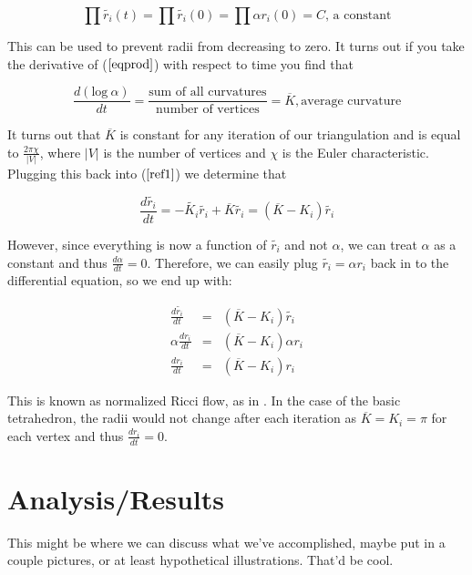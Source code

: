 \documentclass[12pt]{article}
\begin{document}
\begin{equation}
\label{eqprod}
\prod{\tilde{r_i}(t)} = \prod{\tilde{r_i}(0)} = \prod{\alpha r_i(0)} = C\mbox{, a constant}
\end{equation}

\noindent This can be used to prevent radii from decreasing to zero. It turns out if you take the derivative of ($\ref{eqprod}$) with respect to time you find that 
 
\begin{equation}
\frac{d(\mbox{log}~\alpha)}{dt} = \frac{\mbox{sum of all curvatures}}{\mbox{number of vertices}} = \overline{K}, \mbox{average curvature}
\end{equation}
 
\noindent It turns out that $\overline{K}$ is constant for any iteration of our triangulation and is equal to $\displaystyle\frac{2\pi\chi}{|V|}$, where $|V|$ is the number of vertices and $\chi$ is the Euler characteristic. Plugging this back into ($\ref{ref1}$) we determine that

\begin{equation}
\frac{d\tilde{r_i}}{dt} = -\tilde{K_i}\tilde{r_i} + \overline{K}\tilde{r_i} = (\overline{K} - K_i)\tilde{r_i}
\end{equation}

\noindent However, since everything is now a function of $\tilde{r_i}$ and not $\alpha$, we can treat $\alpha$ as a constant and thus $\displaystyle\frac{d\alpha}{dt} = 0$. Therefore, we can easily plug $\tilde{r_i} = \alpha r_i$ back in to the differential equation, so we end up with:

\begin{eqnarray}
\frac{d\tilde{r_i}}{dt} &=& (\overline{K} - K_i)\tilde{r_i} \nonumber \\
\alpha\frac{dr_i}{dt} &=& (\overline{K} - K_i)\alpha r_i \nonumber \\
\frac{dr_i}{dt} &=& (\overline{K} - K_i)r_i
\end{eqnarray}

\noindent This is known as normalized Ricci flow, as in \cite{chowluo}. In the case of the basic tetrahedron, the radii would not change after each iteration as $\overline{K} = K_i = \pi$ for each vertex and thus $\displaystyle\frac{dr_i}{dt} = 0$. 

\newpage
\section{Analysis/Results}
\maketitle
  This might be where we can discuss what we've accomplished, maybe put in a couple pictures, or at least hypothetical illustrations. That'd be cool.\newline
  
\end{document}
